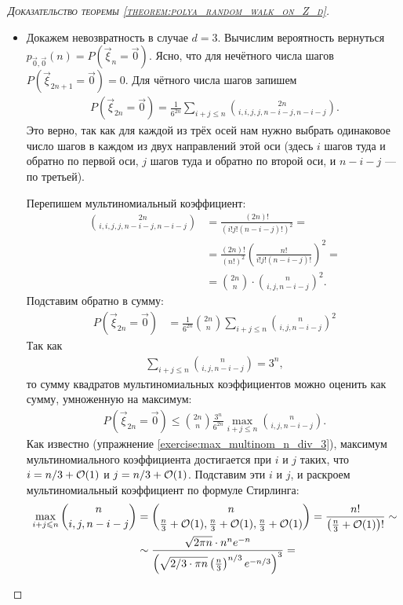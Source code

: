 \documentclass[../main.tex]{subfiles}
\begin{document}
\begin{proof}[\normalfont\textsc{Доказательство теоремы \ref{theorem:polya_random_walk_on_Z_d}}]
\begin{itemize}
   \item Докажем невозвратность в случае $ d =3  $. Вычислим вероятность вернуться $ p_{\vec 0, \vec 0}(n) = P(\vec \xi_n = \vec 0) $. Ясно, что для нечётного числа шагов $ P(\vec \xi_{2n+1} = \vec 0) = 0 $. Для чётного числа шагов запишем
    \begin{align*}
     P(\vec\xi_{2n} = \vec 0) = \frac{1}{6^{2n}} \sum_{i+j \leqslant n} \binom{2n}{i,i,j,j,n-i-j,n-i-j}.
    \end{align*} Это верно, так как для каждой из трёх осей нам нужно выбрать одинаковое число шагов в каждом из двух направлений этой оси (здесь $ i $ шагов туда и обратно по первой оси, $ j $ шагов туда и обратно по второй оси, и $ n - i - j $ --- по третьей).

    Перепишем мультиномиальный  коэффициент:
    \begin{align*}
     \binom{2n}{i,i,j,j,n-i-j,n-i-j} &= \frac{(2n)!}{\left( i!j!(n-i-j)! \right)^{2}} = \\
     &= \frac{(2n)!}{(n!)^{2}} \left( \frac{n!}{i! j! (n-i-j)!} \right)^{2} = \\
     &= \binom{2n} n \cdot \binom{n}{i,j,n-i-j}^{2}.
    \end{align*} Подставим обратно в сумму:
    \begin{align*}
     P(\vec\xi_{2n}=\vec0)&= \frac{1}{6^{2n}}\binom{2n}{n} \sum_{i + j \leqslant n} \binom n {i,j,n-i-j}^{2}
    \end{align*} Так как
    \begin{align*}
     \sum_{i+j \leqslant n} \binom{n}{i,j,n-i-j} = 3^{n},
    \end{align*} то сумму квадратов мультиномиальных коэффициентов можно оценить как сумму, умноженную на максимум:
    \begin{align*}
     P(\vec\xi_{2n}=\vec 0) \leqslant \binom{2n}n \frac{3^{n}}{6^{2n}} \max_{i+j \leqslant n} \binom{n}{i,j,n-i-j}.
    \end{align*} Как известно (упражнение \ref{exercise:max_multinom_n_div_3}), максимум мультиномиального коэффициента достигается при $ i $ и $ j $ таких, что $ i = n / 3 + \mathcal{O}(1) $ и $ j = n / 3 + \mathcal{O}(1) $. Подставим эти $ i $ и $ j $, и раскроем мультиномиальный коэффициент по формуле Стирлинга:
    \begin{align*}
     \max_{i+j \leqslant n} \binom n {i,j,n-i-j} &= \binom n {\frac{n}{3} + \OO(1),\frac{n}{3} + \OO(1),\frac{n}{3}+\OO(1)} = \frac{n!}{\left(\frac{n}{3} + \OO(1)\right)!} \sim \\
     &\sim \frac{\sqrt{2\pi n}\cdot n^{n} e^{-n}}{\left( \sqrt{2 / 3 \cdot \pi n} \left(\frac{n}{3}\right)^{n / 3} e^{-n / 3} \right)^{3}} = \\

\end{align*}
\end{itemize}
\end{proof}
\end{document}
